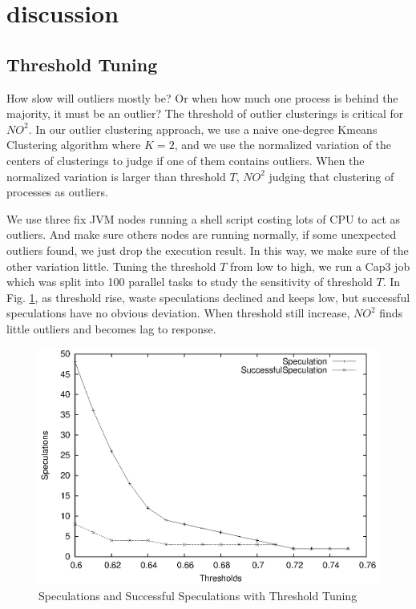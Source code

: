 \section{discussion}

\subsection{Threshold Tuning}

How slow will outliers mostly be? Or when how much one process is behind the majority, it must be an outlier? The threshold of outlier clusterings is critical for $NO^2$. In our outlier clustering approach, we use a naive one-degree Kmeans Clustering algorithm where $K = 2$, and we use the normalized variation of the centers of clusterings to judge if one of them contains outliers. When the normalized variation is larger than threshold $T$, $NO^2$ judging that clustering of processes as outliers.

We use three fix JVM nodes running a shell script costing lots of CPU to act as outliers. And make sure others nodes are running normally, if some unexpected outliers found, we just drop the execution result. In this way, we make sure of the other variation little. Tuning the threshold $T$ from low to high, we run a Cap3 job which was split into 100 parallel tasks to study the sensitivity of threshold $T$. In Fig. \ref{figure:thresholdtuning}, as threshold rise, waste speculations declined and keeps low, but successful speculations have no obvious deviation. When threshold still increase, $NO^2$ finds little outliers and becomes lag to response.

\begin{figure}
\centering
\includegraphics[width=0.9\columnwidth]{figures/threshold&speculation.eps}
\caption{Speculations and Successful Speculations with Threshold Tuning}
\label{figure:thresholdtuning}
\end{figure}

